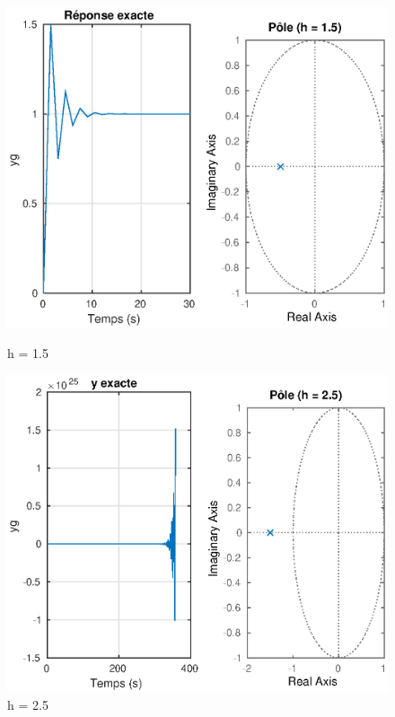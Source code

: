 \begin{figure}[!h]
\begin{minipage}[b]{0.5\linewidth}
    \vspace{4ex}
  \end{minipage} 
  \begin{minipage}[b]{0.5\linewidth}
    \centering
    \includegraphics[width=1\linewidth]{eps/labo1-yg-1-5} 
    \caption{h = 1.5} 
    \vspace{4ex}
  \end{minipage}%
  \begin{minipage}[b]{0.5\linewidth}
    \centering
    \includegraphics[width=1\linewidth]{eps/labo1-yg-2-5} 
    \caption{h = 2.5} 
        \label{gauche-instabilite}
    \vspace{4ex}
  \end{minipage} 
\end{figure}

